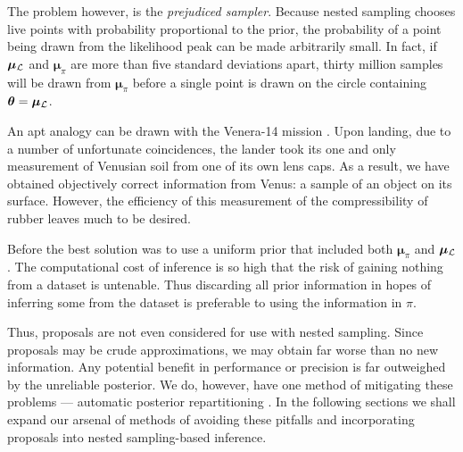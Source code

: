 \documentclass[usenatbib]{mnras}
\begin{document}
The problem however, is the \emph{prejudiced sampler}. Because nested
sampling chooses live points with probability proportional to the
prior, the probability of a point being drawn from the likelihood peak
can be made arbitrarily small. In fact, if $\bm{\mu}_{{\cal L}}$ and
$\bm{\mu}_{\pi}$ are more than five standard deviations apart, thirty
million samples will be drawn from $\bm{\mu}_{\pi}$ before a single
point is drawn on the circle containing
$\bm{\theta} = \bm{\mu}_{{\cal L}}$.

An apt analogy can be drawn with the Venera-14 mission
\citep{siddiqi2018beyond}. Upon landing, due to a number of
unfortunate coincidences, the lander took its one and only measurement
of Venusian soil from one of its own lens caps. As a result, we have
obtained objectively correct information from Venus: a sample of an
object on its surface. However, the efficiency of this measurement of
the compressibility of rubber leaves much to be desired. 

Before \cite{chen-ferroz-hobson} the best solution was to use a
uniform prior that included both $\bm{\mu}_{\pi}$ and
$\bm{\mu}_{{\cal L}}$. The computational cost of inference is so high
that the risk of gaining nothing from a dataset is untenable. Thus
discarding all prior information in hopes of inferring some from the
dataset is preferable to using the information in $\pi$. 

Thus, proposals are not even considered for use with nested sampling.
Since proposals may be crude approximations, we may obtain far worse
than no new information.  Any potential benefit in performance or
precision is far outweighed by the unreliable posterior.  We do,
however, have one method of mitigating these problems --- automatic
posterior repartitioning \citep{chen-ferroz-hobson}. In the following
sections we shall expand our arsenal of methods of avoiding these
pitfalls and incorporating proposals into nested sampling-based
inference.
\end{document}
